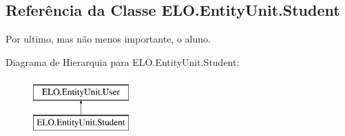 \hypertarget{classELO_1_1EntityUnit_1_1Student}{\subsection{Referência da Classe E\-L\-O.\-Entity\-Unit.\-Student}
\label{classELO_1_1EntityUnit_1_1Student}
}


Por ultimo, mas não menos importante, o aluno.  


Diagrama de Hierarquia para E\-L\-O.\-Entity\-Unit.\-Student\-:\begin{figure}[H]
\begin{center}
\leavevmode
\includegraphics[height=2.000000cm]{dd/d1d/classELO_1_1EntityUnit_1_1Student}
\end{center}
\end{figure}
